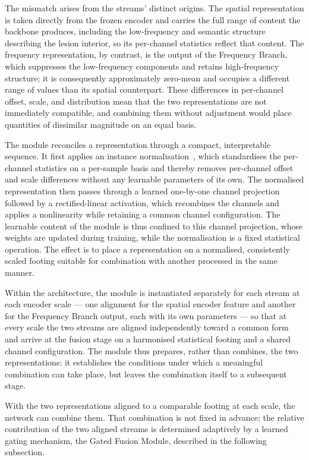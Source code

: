 The mismatch arises from the streams' distinct origins. The spatial representation is taken directly from the frozen encoder and carries the full range of content the backbone produces, including the low-frequency and semantic structure describing the lesion interior, so its per-channel statistics reflect that content. The frequency representation, by contrast, is the output of the Frequency Branch, which suppresses the low-frequency components and retains high-frequency structure; it is consequently approximately zero-mean and occupies a different range of values than its spatial counterpart. These differences in per-channel offset, scale, and distribution mean that the two representations are not immediately compatible, and combining them without adjustment would place quantities of dissimilar magnitude on an equal basis.

The module reconciles a representation through a compact, interpretable sequence. It first applies an instance normalisation~\cite{ref31}, which standardises the per-channel statistics on a per-sample basis and thereby removes per-channel offset and scale differences without any learnable parameters of its own. The normalised representation then passes through a learned one-by-one channel projection followed by a rectified-linear activation, which recombines the channels and applies a nonlinearity while retaining a common channel configuration. The learnable content of the module is thus confined to this channel projection, whose weights are updated during training, while the normalisation is a fixed statistical operation. The effect is to place a representation on a normalised, consistently scaled footing suitable for combination with another processed in the same manner.

Within the architecture, the module is instantiated separately for each stream at each encoder scale --- one alignment for the spatial encoder feature and another for the Frequency Branch output, each with its own parameters --- so that at every scale the two streams are aligned independently toward a common form and arrive at the fusion stage on a harmonised statistical footing and a shared channel configuration. The module thus prepares, rather than combines, the two representations: it establishes the conditions under which a meaningful combination can take place, but leaves the combination itself to a subsequent stage.

With the two representations aligned to a comparable footing at each scale, the network can combine them. That combination is not fixed in advance; the relative contribution of the two aligned streams is determined adaptively by a learned gating mechanism, the Gated Fusion Module, described in the following subsection.

